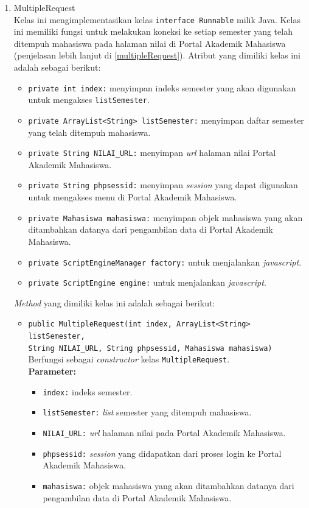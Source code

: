 \begin{enumerate}
	\item{MultipleRequest}\\
	Kelas ini mengimplementasikan kelas \texttt{interface Runnable} milik Java. Kelas ini memiliki fungsi untuk melakukan koneksi ke setiap semester yang telah ditempuh mahasiswa pada halaman nilai di Portal Akademik Mahasiswa (penjelasan lebih lanjut di \ref{multipleRequest}). Atribut yang dimiliki kelas ini adalah sebagai berikut:
	\begin{itemize}
        \item \texttt{private int index:} menyimpan indeks semester yang akan digunakan untuk mengakses \texttt{listSemester}.
        \item \texttt{private ArrayList<String> listSemester:} menyimpan daftar semester yang telah ditempuh mahasiswa.
        \item \texttt{private String NILAI\_URL:} menyimpan \textit{url} halaman nilai Portal Akademik Mahasiswa.
        \item \texttt{private String phpsessid:} menyimpan \textit{session} yang dapat digunakan untuk mengakses menu di Portal Akademik Mahasiswa.
        \item \texttt{private Mahasiswa mahasiswa:} menyimpan objek mahasiswa yang akan ditambahkan datanya dari pengambilan data di Portal Akademik Mahasiswa.
        \item \texttt{private ScriptEngineManager factory:} untuk menjalankan \textit{javascript}.
        \item \texttt{private ScriptEngine engine:} untuk menjalankan \textit{javascript}.
	\end{itemize}
	
	\textit{Method} yang dimiliki kelas ini adalah sebagai berikut:
	\begin{itemize}
		\item \texttt{public MultipleRequest(int index, ArrayList<String> listSemester,\\
		String NILAI\_URL, String phpsessid, Mahasiswa mahasiswa)}\\
		Berfungsi sebagai \textit{constructor} kelas \texttt{MultipleRequest}.\\
		\textbf{Parameter:}
		\begin{itemize}
			\item \texttt{index:} indeks semester.
			\item \texttt{listSemester:} \textit{list} semester yang ditempuh mahasiswa.
			\item \texttt{NILAI\_URL:}  \textit{url} halaman nilai pada Portal Akademik Mahasiswa.
			\item \texttt{phpsessid:} \textit{session} yang didapatkan dari proses login ke Portal Akademik Mahasiswa.
			\item \texttt{mahasiswa:} objek mahasiswa yang akan ditambahkan datanya dari pengambilan data di Portal Akademik Mahasiswa.
		\end{itemize}
		

\end{itemize}
\end{enumerate}

